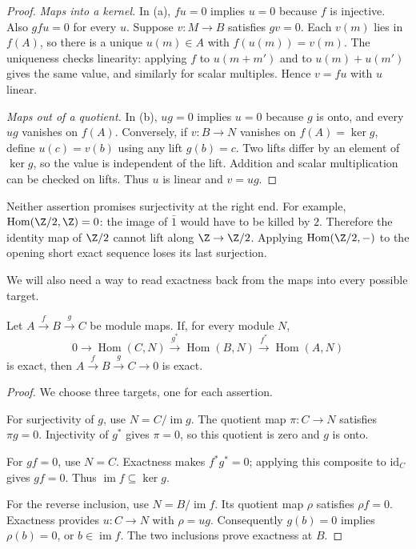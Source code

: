 \begin{proof}
\emph{Maps into a kernel.} In (a), $fu=0$ implies $u=0$ because $f$ is injective. Also $gfu=0$ for every $u$. Suppose $v\colon M\to B$ satisfies $gv=0$. Each $v(m)$ lies in $f(A)$, so there is a unique $u(m)\in A$ with $f(u(m))=v(m)$. The uniqueness checks linearity: applying $f$ to $u(m+m')$ and to $u(m)+u(m')$ gives the same value, and similarly for scalar multiples. Hence $v=fu$ with $u$ linear.

\emph{Maps out of a quotient.} In (b), $ug=0$ implies $u=0$ because $g$ is onto, and every $ug$ vanishes on $f(A)$. Conversely, if $v\colon B\to N$ vanishes on $f(A)=\ker g$, define $u(c)=v(b)$ using any lift $g(b)=c$. Two lifts differ by an element of $\ker g$, so the value is independent of the lift. Addition and scalar multiplication can be checked on lifts. Thus $u$ is linear and $v=ug$.
\end{proof}

Neither assertion promises surjectivity at the right end. For example,
$\operatorname{Hom}(\Z/2,\Z)=0$: the image of $\bar1$ would have to be killed by $2$. Therefore the identity map of $\Z/2$ cannot lift along $\Z\to\Z/2$. Applying $\operatorname{Hom}(\Z/2,-)$ to the opening short exact sequence loses its last surjection.

We will also need a way to read exactness back from the maps into every possible target.

\begin{lemma}\label{lem:testexact}
Let $A\xrightarrow f B\xrightarrow g C$ be module maps. If, for every module $N$,
\[
0\to\operatorname{Hom}(C,N)\xrightarrow{g^*}\operatorname{Hom}(B,N)
\xrightarrow{f^*}\operatorname{Hom}(A,N)
\]
is exact, then $A\xrightarrow f B\xrightarrow g C\to0$ is exact.
\end{lemma}

\begin{proof}
We choose three targets, one for each assertion.

For surjectivity of $g$, use $N=C/\operatorname{im}g$. The quotient map $\pi\colon C\to N$ satisfies $\pi g=0$. Injectivity of $g^*$ gives $\pi=0$, so this quotient is zero and $g$ is onto.

For $gf=0$, use $N=C$. Exactness makes $f^*g^*=0$; applying this composite to $\mathrm{id}_C$ gives $gf=0$. Thus $\operatorname{im}f\subseteq\ker g$.

For the reverse inclusion, use $N=B/\operatorname{im}f$. Its quotient map $\rho$ satisfies $\rho f=0$. Exactness provides $u\colon C\to N$ with $\rho=ug$. Consequently $g(b)=0$ implies $\rho(b)=0$, or $b\in\operatorname{im}f$. The two inclusions prove exactness at $B$.
\end{proof}

